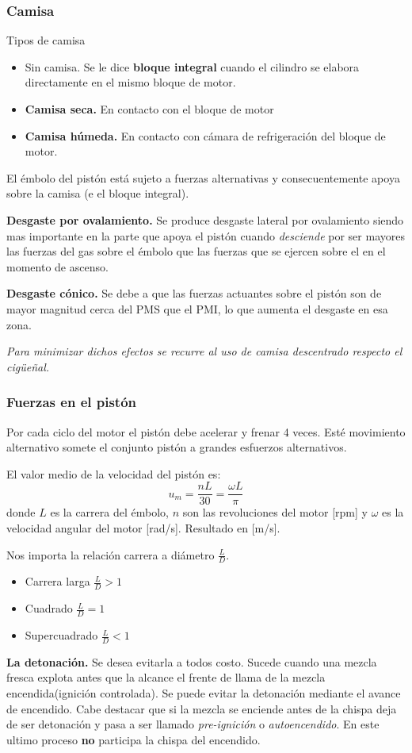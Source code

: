 \subsubsection{Camisa}
Tipos de camisa
\begin{itemize}
    \item Sin camisa. Se le dice \textbf{bloque integral} cuando el cilindro se elabora directamente en el mismo bloque de motor.
    \item \textbf{Camisa seca.} En contacto con el bloque de motor
    \item \textbf{Camisa húmeda.} En contacto con cámara de refrigeración del bloque de motor.
\end{itemize}


El émbolo del pistón está sujeto a fuerzas alternativas y consecuentemente apoya sobre la camisa (e el bloque integral).

\textbf{Desgaste por ovalamiento.} Se produce desgaste lateral por ovalamiento siendo mas importante en la parte que apoya el pistón cuando \textit{desciende} por ser mayores las fuerzas del gas sobre el émbolo que las fuerzas que se ejercen sobre el en el momento de ascenso.

\textbf{Desgaste cónico.} Se debe a que las fuerzas actuantes sobre el pistón son de mayor magnitud cerca del PMS que el PMI, lo que aumenta el desgaste en esa zona. 

\textit{Para minimizar dichos efectos se recurre al uso de camisa descentrado respecto el cigüeñal.}


\subsubsection{Fuerzas en el pistón}
Por cada ciclo del motor el pistón debe acelerar y frenar 4 veces. Esté movimiento alternativo somete el conjunto pistón a grandes esfuerzos alternativos.

El valor medio de la velocidad del pistón es:
\[
u_m = \frac{nL}{30} = \frac{\omega L}{\pi}
\]
donde $L$ es la carrera del émbolo, $n$ son las revoluciones del motor [rpm] y $\omega$ es la velocidad angular del motor [rad/s]. Resultado en [m/s].

Nos importa la relación carrera a diámetro $\frac{L}{D}$.

\begin{itemize}
    \item Carrera larga $\frac{L}{D}>1$
    \item Cuadrado $\frac{L}{D}=1$
    \item Supercuadrado $\frac{L}{D}<1$
\end{itemize}

{\bf La detonación.}
Se desea evitarla a todos costo. Sucede cuando una mezcla fresca explota antes que la alcance el frente de llama de la mezcla encendida(ignición controlada). Se puede evitar la detonación mediante el avance de encendido. Cabe destacar que si la mezcla se enciende antes de la chispa deja de ser detonación y pasa a ser llamado \textit{pre-ignición} o \textit{autoencendido}. En este ultimo proceso \textbf{no} participa la chispa del encendido. 


